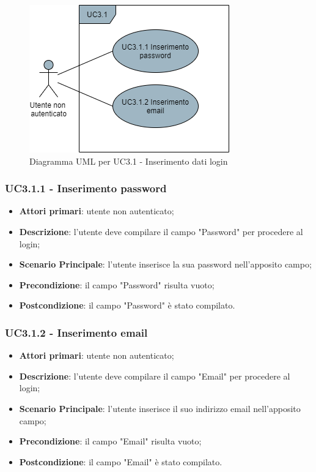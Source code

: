 \begin{figure}[H]
\centering
\includegraphics[scale=0.6]{res/UseCase/Immagini/InserimentoDatiLogin}
\caption{Diagramma UML per UC3.1 - Inserimento dati login}
\end{figure}

\subsubsection{UC3.1.1 - Inserimento password}
\begin{itemize}
\item \textbf{Attori primari}: utente non autenticato;
\item \textbf{Descrizione}: l'utente deve compilare il campo "Password" per procedere al login;
\item \textbf{Scenario Principale}: l'utente inserisce la sua password nell'apposito campo;
\item \textbf{Precondizione}: il campo "Password" risulta vuoto;
\item \textbf{Postcondizione}: il campo "Password" è stato compilato.
\end{itemize}

\subsubsection{UC3.1.2 - Inserimento email}
\begin{itemize}
\item \textbf{Attori primari}: utente non autenticato;
\item \textbf{Descrizione}: l'utente deve compilare il campo "Email" per procedere al login;
\item \textbf{Scenario Principale}: l'utente inserisce il suo indirizzo email nell'apposito campo;
\item \textbf{Precondizione}: il campo "Email" risulta vuoto;
\item \textbf{Postcondizione}: il campo "Email" è stato compilato.
\end{itemize}

